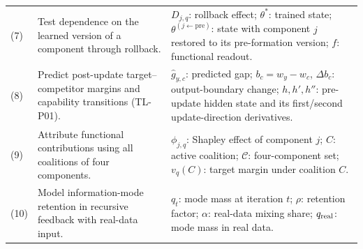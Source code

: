 \documentclass[12pt,letterpaper]{article}
\begin{document}
\begin{center}
\begin{minipage}{\textwidth}
\begin{tabular}{@{}p{0.41in}>{\raggedright\arraybackslash}p{2.15in}>{\raggedright\arraybackslash}p{3.64in}@{}}
\addlinespace[3pt]
(7) & Test dependence on the learned version of a component through rollback. & $D_{j,q}$: rollback effect; $\theta^*$: trained state; $\theta^{(j\leftarrow\mathrm{pre})}$: state with component $j$ restored to its pre-formation version; $f$: functional readout.\\
\addlinespace[3pt]
(8) & Predict post-update target--competitor margins and capability transitions (TL-P01). & $\widehat g_{y,c}$: predicted gap; $b_c=w_y-w_c$, $\Delta b_c$: output-boundary change; $h,h',h''$: pre-update hidden state and its first/second update-direction derivatives.\\
\addlinespace[3pt]
(9) & Attribute functional contributions using all coalitions of four components. & $\phi_{j,q}$: Shapley effect of component $j$; $C$: active coalition; $\mathcal C$: four-component set; $v_q(C)$: target margin under coalition $C$.\\
\addlinespace[3pt]
(10) & Model information-mode retention in recursive feedback with real-data input. & $q_t$: mode mass at iteration $t$; $\rho$: retention factor; $\alpha$: real-data mixing share; $q_{\rm real}$: mode mass in real data.\\
\bottomrule
\end{tabular}
\endgroup
\end{minipage}
\end{center}
\end{document}

